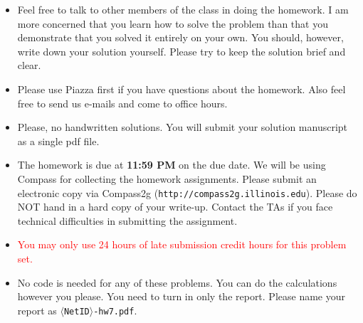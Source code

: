 
\usepackage{amsmath,url,graphicx,amssymb}
\usepackage{xcolor}
\sloppy

\oddsidemargin 0in
\evensidemargin 0in
\textwidth 6.5in
\topmargin -0.5in
\textheight 9.0in

\newcommand{\bb}[1]{{\bf #1}}
\newcommand{\tight}[1]{\!#1\!}
\newcommand{\loose}[1]{\;#1\;}




\begin{footnotesize}
  \begin{itemize}
    \item Feel free to talk to other members of the class in doing the homework.
      I am more concerned that you learn how to solve the problem than that you
      demonstrate that you solved it entirely on your own.  You should, however,
      write down your solution yourself.  Please try to keep the solution brief
      and clear.

    \item Please use Piazza first if you have questions about the homework.
      Also feel free to send us e-mails and come to office hours.

    \item Please, no handwritten solutions.  You will submit your solution
      manuscript as a single pdf file.

    \item The homework is due at \textbf{11:59 PM} on the due date. We will be
      using Compass for collecting the homework assignments. Please submit an
      electronic copy via Compass2g (\texttt{http://compass2g.illinois.edu}).
      Please do NOT hand in a hard copy of your write-up.  Contact the TAs if you
      face technical difficulties in submitting the assignment.

    \item \textcolor{red}{You may only use 24 hours of late submission credit hours for this problem set.}

    \item No code is needed for any of these problems. You can do the
      calculations however you please. You need to turn in only the report. Please
      name your report as \texttt{$\langle$NetID$\rangle$-hw7.pdf}.
  \end{itemize}
\end{footnotesize}

